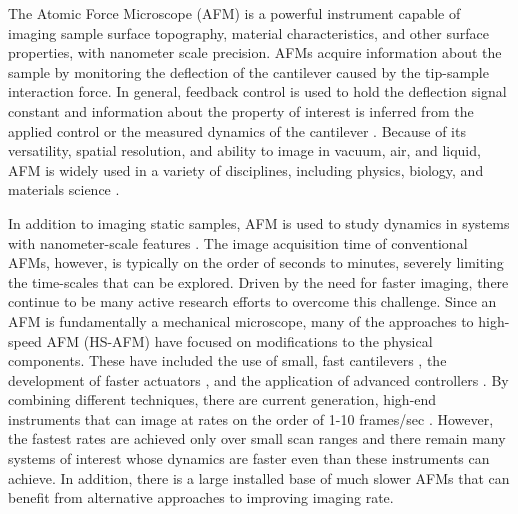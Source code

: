 \documentclass[journal]{IEEEtran}
\begin{document}




The Atomic Force Microscope (AFM) is a powerful instrument capable of
imaging sample surface topography, material characteristics, and other
surface properties, with nanometer scale precision. AFMs acquire
information about the sample by monitoring the deflection of the
cantilever caused by the tip-sample interaction force. In general,
feedback control is used to hold the deflection signal constant and
information about the property of interest is inferred from the
applied control or the measured dynamics of the cantilever
\cite{Abramovitch:2007gt}. Because of its versatility, spatial
resolution, and ability to image in vacuum, air, and liquid, AFM is
widely used in a variety of disciplines, including physics, biology,
and materials science
\cite{Dufrene:2017gm,Yang:2017im,Payton:2016hj,Altman:2015ic,Haase:2015eh}.
	
In addition to imaging static samples, AFM is used to study dynamics
in systems with nanometer-scale features
\cite{Yang:2017im,Shibata:2017da,Shibata:2015jd,Ando:2014ja}. The
image acquisition time of conventional AFMs, however, is typically on
the order of seconds to minutes, severely limiting the time-scales
that can be explored. Driven by the need for faster imaging, there
continue to be many active research efforts to overcome this
challenge. Since an AFM is fundamentally a mechanical microscope, many
of the approaches to high-speed AFM (HS-AFM) have focused on
modifications to the physical components. These have included the use
of small, fast cantilevers \cite{Viani:1999tp,
  braunsmann2010high,Adams:2016hg}, the development of faster
actuators \cite{Maroufi:2015gt,Yong:2012kd,Kenton:2012cm}, and
the application of advanced controllers
\cite{Rana:2018es,Yong:2015gr,butterworth_discrete_2012,salapaka2002high}.
By combining different techniques, there are current generation,
high-end instruments that can image at rates on the order of 1-10
frames/sec \cite{Ando:2014ja}. However, the fastest rates are achieved
only over small scan ranges and there remain many systems of interest
whose dynamics are faster even than these instruments can achieve. In
addition, there is a large installed base of much slower AFMs that can
benefit from alternative approaches to improving imaging rate.
	
\end{document}
